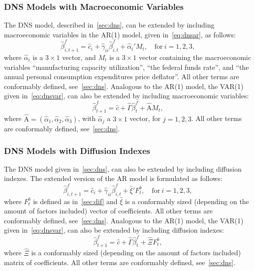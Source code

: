 \subsubsection{DNS Models with Macroeconomic Variables}
\label{sec:dnsmv}
The DNS model, described in~\cref{sec:dns}, can be extended by including macroeconomic variables in the AR(1) model, given in~\cref{eq:dnsar}, as follows:
\begin{equation}
	\hat{\beta}_{i,t+1}^{f} = \hat{c}_i + \hat{\gamma}_{ii} \hat{\beta}_{i,t}^f + \hat{\alpha}_i' M_t, \quad \text{for}~i = 1,2,3,
\end{equation}
where $\hat{\alpha}_i$ is a $3 \times 1$ vector, and $M_t$ is a $3 \times 1$ vector containing the macroeconomic variables \enquote{manufacturing capacity utilization}, \enquote{the federal funds rate}, and \enquote{the annual personal consumption expenditures price deflator}. 
All other terms are conformably defined, see~\cref{sec:dns}. 
Analogous to the AR(1) model, the VAR(1) given in~\cref{eq:dnsvar}, can also be extended by including macroeconomic variables:
\begin{equation}
	\hat{\beta}_{t+1}^{f} = \hat{c} + \hat{\Gamma} \hat{\beta}_t^f + \hat{\mathrm{A}} M_t,
\end{equation}
where $\hat{\mathrm{A}} = \left(\hat{\alpha}_1, \hat{\alpha}_2, \hat{\alpha}_3 \right)$, with $\hat{\alpha}_j$ a $3 \times 1$ vector, for $j = 1,2,3$. 
All other terms are conformably defined, see~\cref{sec:dns}.

\subsubsection{DNS Models with Diffusion Indexes}
\label{sec:dnsdif}
The DNS model given in~\cref{sec:dns}, can also be extended by including diffusion indexes. The extended version of the AR model is formulated as follows:
\begin{equation}
	\hat{\beta}_{i,t+1}^{f} = \hat{c}_i + \hat{\gamma}_{ii} \hat{\beta}_{i,t}^f + \hat{\xi}' F_t^b, \quad \text{for}~i = 1,2,3,
\end{equation}
where $F_t^b$ is defined as in~\cref{sec:dif} and $\hat{\xi}$ is a conformably sized (depending on the amount of factors included) vector of coefficients. 
All other terms are conformably defined, see~\cref{sec:dns}. 
Analogous to the AR(1) model, the VAR(1) given in~\cref{eq:dnsvar}, can also be extended by including diffusion indexes:
\begin{equation}
	\hat{\beta}_{t+1}^{f} = \hat{c} + \hat{\Gamma} \hat{\beta}_t^f + \hat{\Xi} F_t^b,
\end{equation}
where $\hat{\Xi}$ is a conformably sized (depending on the amount of factors included) matrix of coefficients. 
All other terms are conformably defined, see~\cref{sec:dns}.

